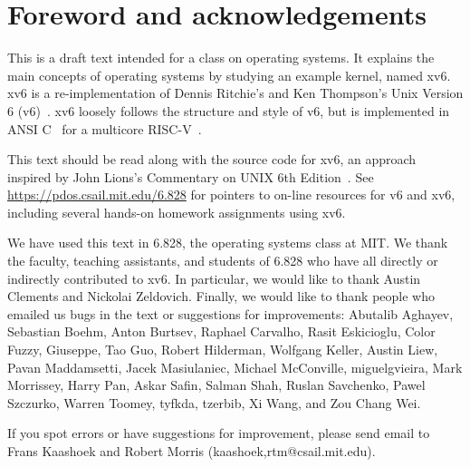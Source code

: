 \chapter*{Foreword and acknowledgements}


This is a draft text intended for a class on operating systems. It
explains the main concepts of operating systems by studying an example
kernel, named xv6.  xv6 is a re-implementation of Dennis Ritchie's and
Ken Thompson's Unix Version 6 (v6)~\cite{unix}.  xv6 loosely follows the structure
and style of v6, but is implemented in ANSI C~\cite{kernighan} for 
a multicore RISC-V~\cite{riscv}.

This text should be read along with the source code for xv6, an approach 
inspired by John Lions's Commentary on UNIX 6th Edition~\cite{lions}. See
\url{https://pdos.csail.mit.edu/6.828} for pointers to on-line
resources for v6 and xv6, including several hands-on homework assignments
using xv6.

We have used this text in 6.828, the operating systems class at MIT.
We thank the faculty, teaching assistants, and students of 6.828 who
have all directly or indirectly contributed to xv6.  In particular, we
would like to thank Austin Clements and Nickolai Zeldovich.  Finally,
we would like to thank people who emailed us bugs in the text or
suggestions for improvements: Abutalib Aghayev, Sebastian Boehm, Anton
Burtsev, Raphael Carvalho, Rasit Eskicioglu, Color Fuzzy, Giuseppe,
Tao Guo, Robert Hilderman, Wolfgang Keller, Austin Liew, Pavan
Maddamsetti, Jacek Masiulaniec, Michael McConville, miguelgvieira,
Mark Morrissey, Harry Pan, Askar Safin, Salman Shah, Ruslan Savchenko,
Pawel Szczurko, Warren Toomey, tyfkda, tzerbib, Xi Wang, and Zou Chang Wei.

If you spot errors or have suggestions for improvement, please send email to
Frans Kaashoek and Robert Morris (kaashoek,rtm@csail.mit.edu).
